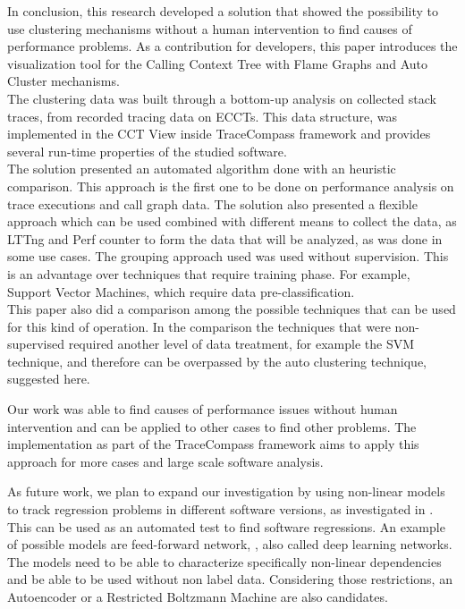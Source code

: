 In conclusion, this research developed a solution that showed the possibility to use clustering mechanisms without a human intervention to find causes of performance problems. As a contribution for developers, this  paper  introduces  the  visualization  tool  for  the  Calling Context Tree with Flame Graphs and Auto Cluster mechanisms. \\
The clustering data was built through a bottom-up analysis on collected stack traces, from recorded tracing data on ECCTs. This data structure, was implemented in the CCT View inside TraceCompass framework and provides several run-time properties of the studied software.\\
The solution presented an automated algorithm done with an heuristic comparison. This approach is the first one to be done on performance analysis on trace executions and call graph data. The solution also presented a flexible approach which can be used combined with different means to collect the data, as LTTng and Perf counter to form the data that will be analyzed, as was done in some use cases.
The grouping approach used was used  without supervision. This is an advantage over techniques that require training phase. For example, Support Vector Machines, which require data pre-classification. \\

This paper also did a comparison among the possible techniques that can be used for this kind of operation. In the comparison the techniques that were non-supervised required another level of data treatment, for example the SVM technique, and therefore can be overpassed by the auto clustering technique, suggested here.

Our work was able to find causes of performance issues without human intervention and can be applied to other cases to find other problems. The implementation as part of the TraceCompass framework aims to apply this approach for more cases and large scale software analysis.

As future work, we plan to expand our investigation by using non-linear models to track regression problems in different software versions, as investigated in \cite{deep}. This can be used as an automated test to find software regressions. An example of possible models are feed-forward network, \cite{deep}, also called deep learning networks.
The models need to be able to characterize specifically non-linear dependencies and be able to be used without non label data. Considering those restrictions, an Autoencoder or a Restricted Boltzmann Machine are also candidates.\\ 

